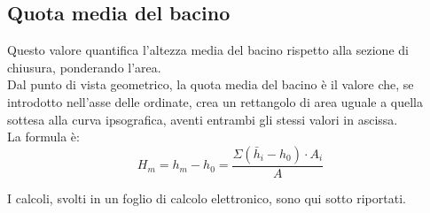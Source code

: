 \subsection{Quota media del bacino}
Questo valore quantifica l'altezza media del bacino rispetto alla sezione di chiusura, ponderando l'area.\\
Dal punto di vista geometrico, la quota media del bacino è il valore che, se introdotto nell'asse delle ordinate, crea un rettangolo di area uguale a quella sottesa alla curva ipsografica, aventi entrambi gli stessi valori in ascissa.\\
La formula è:
\begin{equation}
    H_m = h_m - h_0 = \frac{\Sigma (\bar{h}_i - h_0) \cdot A_i}{A}
    \label{eq:quota_media}
\end{equation}

I calcoli, svolti in un foglio di calcolo elettronico, sono qui sotto riportati.

